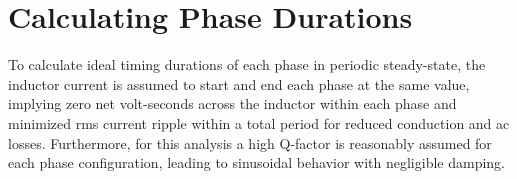 

\vspace{-10pt}
\section{Calculating Phase Durations}
\vspace{-0.75em}
To calculate ideal timing durations of each phase in periodic steady-state, the inductor current is assumed to start and end each phase at the same value, implying zero net volt-seconds across the inductor within each phase and minimized rms current ripple within a total period for reduced conduction and ac losses.
Furthermore, for this analysis a high Q-factor is reasonably assumed for each phase configuration, leading to sinusoidal behavior with negligible damping.



